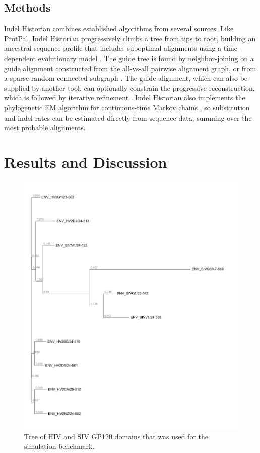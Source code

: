 \documentclass{bioinfo}
\begin{document}
\begin{methods}
\section{Methods}

Indel Historian combines established algorithms from several sources.
Like ProtPal, Indel Historian progressively climbs a tree from tips to root,
building an ancestral sequence profile that includes suboptimal alignments \citep{LeeGrassoSharlow2002,Westesson2012-zg}
using a time-dependent evolutionary model \citep{RivasEddy2015}.
The guide tree is found by neighbor-joining %
on a guide alignment constructed from the all-vs-all pairwise alignment graph,
or from a sparse random connected subgraph \citep{BradleyEtAl2009}.
The guide alignment, which can also be supplied by another tool,
can optionally constrain the progressive reconstruction,
which is followed by iterative refinement \citep{HolmesBruno2001,Edgar2004b}.
Indel Historian also implements the phylogenetic EM algorithm for continuous-time Markov chains \citep{HolmesRubin2002},
so substitution and indel rates can be estimated directly from sequence data,
summing over the most probable alignments.

\end{methods}

\section{Results and Discussion}

\begin{figure}
  \includegraphics[width=\columnwidth]{gp120tree.pdf}
  \caption{
    Tree of HIV and SIV GP120 domains that was used for the simulation benchmark.
  }
\end{figure}
\end{document}
